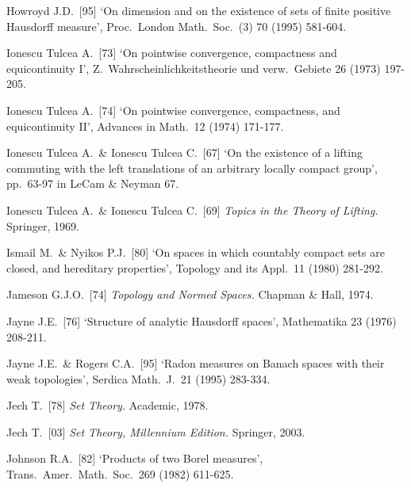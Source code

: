 {
Howroyd J.D.\ [95] `On dimension and on the existence of sets of finite
positive Hausdorff measure', Proc.\ London Math.\ Soc.\ (3) 70 (1995)
581-604.
\cmmnt{[471R, 471S.]}

\medskip%

Ionescu Tulcea A.\ [73] `On pointwise convergence, compactness and
equicontinuity I', Z.\ Wahrscheinlichkeitstheorie und verw.\ Gebiete 26
(1973) 197-205.
\cmmnt{[463C.]}

Ionescu Tulcea A.\ [74] `On pointwise convergence, compactness, and
equicontinuity II', Advances in Math.\ 12 (1974) 171-177.
\cmmnt{[463G.]}

Ionescu Tulcea A.\ \& Ionescu Tulcea C.\ [67] `On the existence of a
lifting commuting with the left translations of an arbitrary locally
compact group', pp.\ 63-97 in {\smc LeCam \& Neyman 67}.

Ionescu Tulcea A.\ \& Ionescu Tulcea C.\ [69] {\it Topics in the Theory
of Lifting.}  Springer, 1969.
\cmmnt{[\S453 {\it intro.}]}

Ismail M.\ \& Nyikos P.J.\ [80] `On spaces in which countably compact
sets are closed, and hereditary properties', Topology and its Appl.\ 11
(1980) 281-292.
\cmmnt{[\S434 {\it notes\/}.]}

\medskip%


Jameson G.J.O.\ [74] {\it Topology and Normed Spaces.}  Chapman \& Hall,
1974.
\cmmnt{[\S4A4.]}

Jayne J.E.\ [76] `Structure of analytic Hausdorff spaces', Mathematika
23 (1976) 208-211.
\cmmnt{[422Yb.]}

Jayne J.E.\ \& Rogers C.A.\ [95] `Radon measures on Banach spaces with
their weak topologies', Serdica Math.\ J.\ 21 (1995) 283-334.
\cmmnt{[466H, \S466 {\it notes\/}.]}

Jech T.\ [78] {\it Set Theory.}  Academic, 1978.
\cmmnt{[423Q, \S4A1.]}

Jech T.\ [03] {\it Set Theory, Millennium Edition.}  Springer, 2003.
\cmmnt{[\S4A1.]}

Johnson R.A.\ [82] `Products of two Borel measures', Trans.\ Amer.\
Math.\ Soc.\ 269 (1982) 611-625.
\cmmnt{[434R.]}

}
